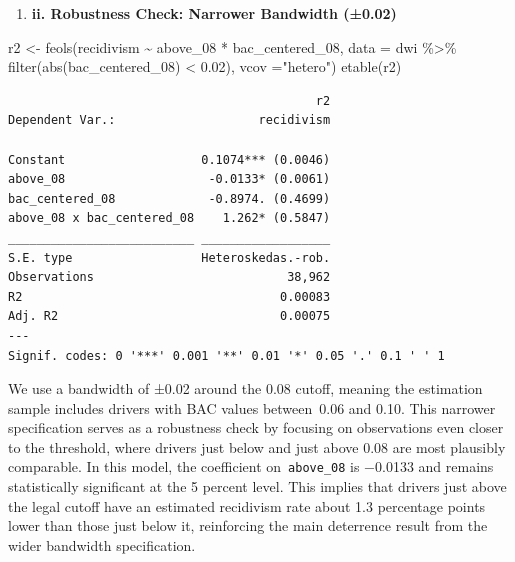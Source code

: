 \documentclass[
  letterpaper,
  DIV=11,
  numbers=noendperiod]{scrartcl}
\newenvironment{Shaded}{\begin{snugshade}}{\end{snugshade}}
\newcommand{\AttributeTok}[1]{\textcolor[rgb]{0.40,0.45,0.13}{#1}}
\newcommand{\FloatTok}[1]{\textcolor[rgb]{0.68,0.00,0.00}{#1}}
\newcommand{\FunctionTok}[1]{\textcolor[rgb]{0.28,0.35,0.67}{#1}}
\newcommand{\NormalTok}[1]{\textcolor[rgb]{0.00,0.23,0.31}{#1}}
\newcommand{\OtherTok}[1]{\textcolor[rgb]{0.00,0.23,0.31}{#1}}
\newcommand{\SpecialCharTok}[1]{\textcolor[rgb]{0.37,0.37,0.37}{#1}}
\newcommand{\StringTok}[1]{\textcolor[rgb]{0.13,0.47,0.30}{#1}}
\providecommand{\tightlist}{%
  \setlength{\itemsep}{0pt}\setlength{\parskip}{0pt}}
\begin{document}
\begin{enumerate}
\def\labelenumi{\arabic{enumi}.}
\setcounter{enumi}{6}
\tightlist
\item
  \textbf{ii. Robustness Check: Narrower Bandwidth (±0.02)}
\end{enumerate}

\begin{Shaded}
\begin{Highlighting}[]
\NormalTok{r2 }\OtherTok{\textless{}{-}} \FunctionTok{feols}\NormalTok{(recidivism }\SpecialCharTok{\textasciitilde{}}\NormalTok{ above\_08 }\SpecialCharTok{*}\NormalTok{ bac\_centered\_08,}
            \AttributeTok{data =}\NormalTok{ dwi }\SpecialCharTok{\%\textgreater{}\%} \FunctionTok{filter}\NormalTok{(}\FunctionTok{abs}\NormalTok{(bac\_centered\_08) }\SpecialCharTok{\textless{}} \FloatTok{0.02}\NormalTok{), }\AttributeTok{vcov =}\StringTok{"hetero"}\NormalTok{)}
\FunctionTok{etable}\NormalTok{(r2)}
\end{Highlighting}
\end{Shaded}

\begin{verbatim}
                                           r2
Dependent Var.:                    recidivism
                                             
Constant                   0.1074*** (0.0046)
above_08                    -0.0133* (0.0061)
bac_centered_08             -0.8974. (0.4699)
above_08 x bac_centered_08    1.262* (0.5847)
__________________________ __________________
S.E. type                  Heteroskedas.-rob.
Observations                           38,962
R2                                    0.00083
Adj. R2                               0.00075
---
Signif. codes: 0 '***' 0.001 '**' 0.01 '*' 0.05 '.' 0.1 ' ' 1
\end{verbatim}

We use a bandwidth of ±0.02 around the 0.08 cutoff, meaning the
estimation sample includes drivers with BAC values between~0.06 and
0.10. This narrower specification serves as a robustness check by
focusing on observations even closer to the threshold, where drivers
just below and just above 0.08 are most plausibly comparable. In this
model, the coefficient on~\texttt{above\_08} is −0.0133 and remains
statistically significant at the 5 percent level. This implies that
drivers just above the legal cutoff have an estimated recidivism rate
about 1.3 percentage points lower than those just below it, reinforcing
the main deterrence result from the wider bandwidth specification.
\end{document}
